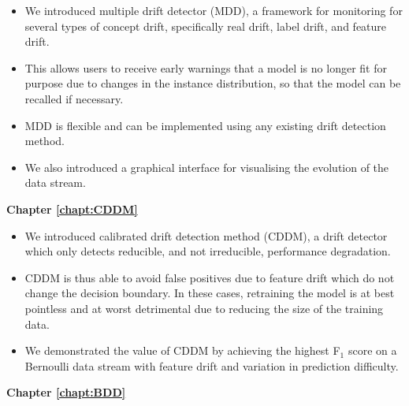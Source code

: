 \begin{itemize}
  \item We introduced multiple drift detector (MDD), a framework  for monitoring for several types of concept drift, specifically real drift, label drift, and feature drift.
  \item This allows users to receive early warnings that a model is no longer fit for purpose due to changes in the instance distribution, so that the model can be recalled if necessary.   
  \item MDD is flexible and can be implemented using any existing drift detection method.
  \item We also introduced a graphical interface for visualising the evolution of the data stream.
\end{itemize}
{\bf Chapter \ref{chapt:CDDM}}
\begin{itemize}
  \item We introduced calibrated drift detection method (CDDM), a drift detector which only detects reducible, and not irreducible, performance degradation. 
  \item CDDM is thus able to avoid false positives due to feature drift which do not change the decision boundary. In these cases, retraining the model is at best pointless and at worst detrimental due to reducing the size of the training data.
  \item We demonstrated the value of CDDM by achieving the highest F$_1$ score on a Bernoulli data stream with feature drift and variation in prediction difficulty.
\end{itemize}
{\bf Chapter \ref{chapt:BDD}}
